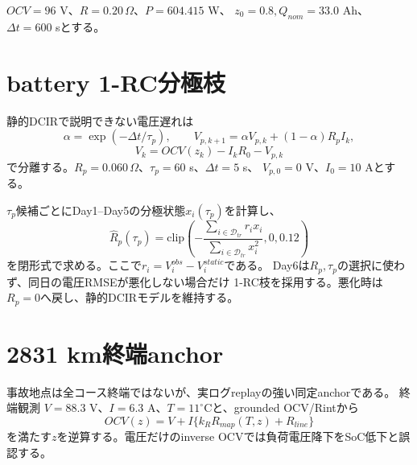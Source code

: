 $OCV=96$ V、$R=0.20\,\Omega$、$P=604.415$ W、
$z_0=0.8,Q_{nom}=33.0$ Ah、$\Delta t=600$ sとする。



\section{battery 1-RC分極枝}
静的DCIRで説明できない電圧遅れは
\[
\alpha=\exp(-\Delta t/\tau_p),\qquad
V_{p,k+1}=\alpha V_{p,k}+(1-\alpha)R_pI_k,
\]
\[
V_k=OCV(z_k)-I_kR_0-V_{p,k}
\]
で分離する。$R_p=0.060\,\Omega$、$\tau_p=60$ s、$\Delta t=5$ s、
$V_{p,0}=0$ V、$I_0=10$ Aとする。


$\tau_p$候補ごとにDay1--Day5の分極状態$x_i(\tau_p)$を計算し、
\[
 \hat R_p(\tau_p)=\mathrm{clip}\!\left(
 -\frac{\sum_{i\in\mathcal D_{tr}}r_i x_i}
 {\sum_{i\in\mathcal D_{tr}}x_i^2},0,0.12\right)
\]
を閉形式で求める。ここで$r_i=V_i^{obs}-V_i^{static}$である。
Day6は$R_p,\tau_p$の選択に使わず、同日の電圧RMSEが悪化しない場合だけ
1-RC枝を採用する。悪化時は$R_p=0$へ戻し、静的DCIRモデルを維持する。


\section{2831 km終端anchor}
事故地点は全コース終端ではないが、実ログreplayの強い同定anchorである。
終端観測 $V=88.3$ V、$I=6.3$ A、$T=11^\circ$Cと、grounded OCV/Rintから
\[
OCV(z)=V+I\{k_RR_{map}(T,z)+R_{line}\}
\]
を満たす$z$を逆算する。電圧だけのinverse OCVでは負荷電圧降下をSoC低下と誤認する。


